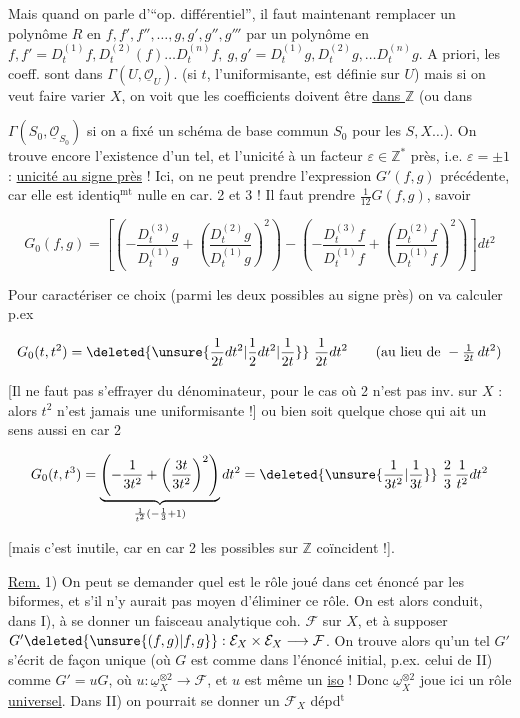 
Mais quand on parle d'``op. différentiel'', il faut maintenant remplacer un polynôme $R$ en $f,f',f'',\ldots,g,g',g'',g'''$ par un polynôme en $f,f'=D_t^{(1)}f,D_t^{(2)}(f)\ldots D_t^{(n)}f,\ g,g'=D_t^{(1)}g,D_t^{(2)}g,\ldots D_t^{(n)}g$.  A priori, les coeff. sont dans $\Gamma(U,\underline{\mathcal O}_U)$. (si $t$,  l'uniformisante, est définie sur $U$) mais si on  veut faire varier $X$, on voit que les coefficients doivent être \uline{dans $\mathbb Z$} (ou dans

$\Gamma(S_0,\underline{\mathcal O}_{S_0})$ si on a fixé un schéma de base commun $S_0$ pour les $S,X\ldots$). On trouve encore l'existence d'un tel, et l'unicité à un facteur $\varepsilon\in\mathbb Z^*$ près, i.e. $\varepsilon=\pm1$ : \uline{unicité au signe près} ! Ici, on ne peut prendre l'expression $G'(f,g)$ précédente, car elle est identiq$^{\mathrm{mt}}$ nulle en car. 2 et 3 ! Il faut prendre $\frac1{12}G(f,g)$, savoir

\[
G_0(f,g)=\left[\left(-\frac{D_t^{(3)}g}{D_t^{(1)}g}+\left(\frac{D_t^{(2)}g}{D_t^{(1)}g}\right)^2\right)
-\left(-\frac{D_t^{(3)}f}{D_t^{(1)}f}+\left(\frac{D_t^{(2)}f}{D_t^{(1)}f}\right)^2\right)\right]dt^2
\]

Pour caractériser ce choix (parmi les deux possibles au signe près) on va calculer p.ex

\[
G_0(t,t^2)=\deleted{\unsure{\frac1{2t}dt^2|\frac1{2}dt^2|\frac1{2t}}}\ \frac1{2t}dt^2\qquad
\text{(au lieu de }-\tfrac1{2t}\,dt^2\text{)}
\]

[Il ne faut pas s'effrayer du dénominateur, pour le cas où 2 n'est pas inv. sur $X$ : alors $t^2$ n'est jamais une uniformisante !] ou bien soit quelque chose qui ait un sens aussi en car 2

\[
G_0(t,t^3)=\underbrace{\left(-\frac1{3t^2}+\left(\frac{3t}{3t^2}\right)^2\right)}_{\frac1{t^2}(-\frac13+1)}dt^2
=\deleted{\unsure{\frac1{3t^2}|\frac1{3t}}}\ \frac23\,\frac1{t^2}dt^2
\]

[mais c'est inutile, car en car 2 les   possibles sur $\mathbb Z$ coïncident !].

\uline{Rem.} 1) On peut se demander quel est le rôle joué dans cet énoncé par les biformes, et s'il n'y aurait pas moyen d'éliminer ce rôle. On est alors conduit, dans I), à se donner un faisceau analytique coh. $\mathcal F$ sur $X$, et à supposer $G'\deleted{\unsure{(f,g)|f,g}}:\mathcal E_X\times\mathcal E_X\longrightarrow\mathcal F$. On trouve alors qu'un tel $G'$ s'écrit de façon unique (où $G$ est comme dans l'énoncé initial, p.ex. celui de II) comme $G'=uG$, où $u:\underline\omega_X^{\otimes2}\longrightarrow\mathcal F$, et $u$ est même un \uline{iso} ! Donc $\underline\omega_X^{\otimes2}$ joue ici un rôle \uline{universel}. Dans II) on pourrait se donner un $\mathcal F_X$ dépd$^{\mathrm{t}}$
